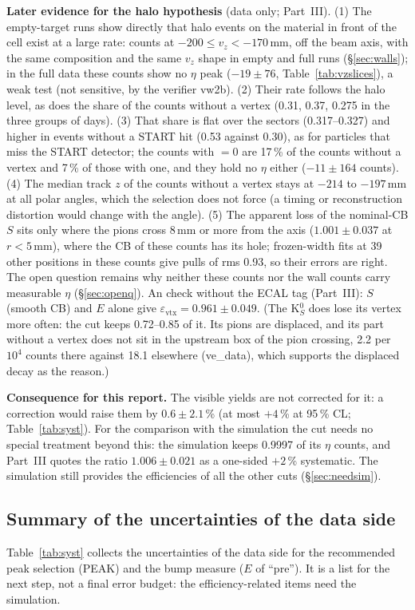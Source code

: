 \documentclass[11pt,a4paper]{article}
\newcommand{\code}[1]{\texttt{\detokenize{#1}}}
\newcommand{\vz}{\ensuremath{v_z}\xspace}
\begin{document}
\textbf{Later evidence for the halo hypothesis} (data only; Part~III). (1) The empty-target runs show directly that halo events on the material
in front of the cell exist at a large rate: counts at $-200\le\vz<-170$\,mm, off the beam axis, with the same composition and the same \vz
shape in empty and full runs (\S\ref{sec:walls}); in the full data these counts show no $\eta$ peak ($-19\pm76$, Table~\ref{tab:vzslices}), a
weak test (not sensitive, by the verifier vw2b). (2) Their rate follows the halo level, as does the share of the counts
without a vertex (0.31, 0.37, 0.275 in the three groups of days). (3) That share is flat over the sectors (0.317--0.327) and higher in events
without a START hit (0.53 against 0.30), as for particles that miss the START detector; the counts with \code{evtStart} $=0$ are 17\,\% of the counts
without a vertex and 7\,\% of those with one, and they hold no $\eta$ either ($-11\pm164$ counts). (4) The median track $z$ of the counts without a
vertex stays at $-214$ to $-197$\,mm at all polar angles, which the selection does not force (a timing or reconstruction distortion would change
with the angle). (5) The apparent loss of the nominal-CB $S$ sits only where the pions cross 8\,mm or more from the axis ($1.001\pm0.037$ at
$r<5$\,mm), where the CB of these counts has its hole; frozen-width fits at 39 other positions in these counts give pulls of rms 0.93, so their
errors are right. The open question remains why neither these counts nor the wall counts carry measurable $\eta$ (\S\ref{sec:openq}). An
check without the ECAL tag (Part~III): $S$ (smooth CB) and $E$ alone give $\varepsilon_{\mathrm{vtx}}=0.961\pm0.049$. (The K$^0_S$ does lose its vertex more often: the
cut keeps 0.72--0.85 of it. Its pions are displaced, and its part without a vertex does not sit in the upstream box of the pion crossing, 2.2
per $10^4$ counts there against 18.1 elsewhere (ve\_data), which supports the displaced decay as the reason.)

\textbf{Consequence for this report.} The visible yields are not corrected for it: a correction would raise them by $0.6\pm2.1$\,\% (at most
$+4$\,\% at 95\,\% CL; Table~\ref{tab:syst}). For the comparison with the simulation the cut needs no special treatment beyond this: the
simulation keeps 0.9997 of its $\eta$ counts, and Part~III quotes the ratio $1.006\pm0.021$ as a one-sided $+2$\,\% systematic. The simulation
still provides the efficiencies of all the other cuts (\S\ref{sec:needsim}).

\subsection{Summary of the uncertainties of the data side}
\label{sec:syst}
Table~\ref{tab:syst} collects the uncertainties of the data side for the recommended peak selection (PEAK) and the bump measure ($E$ of
``pre''). It is a list for the next step, not a final error budget: the efficiency-related items need the simulation.
\end{document}
